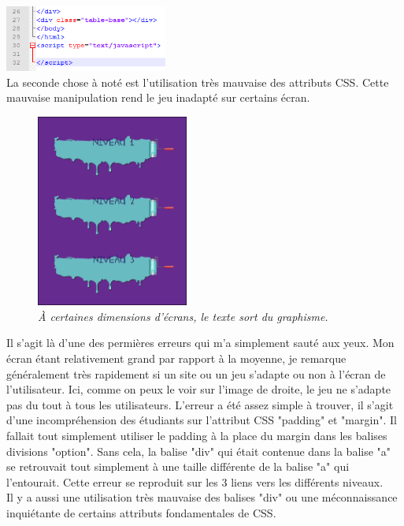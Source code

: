 \documentclass{article}
\begin{document}
\vspace{0.4cm}
\includegraphics[width=0.40\textwidth]{9}\\

La seconde chose \`a not\'e est l'utilisation tr\`es mauvaise des attributs CSS. Cette mauvaise manipulation rend le jeu inadapt\'e sur certains \'ecran.\\
\begin{figure}
\vspace{-13pt}
\centering
\includegraphics[width=5cm]{1}
\caption{\textit{\`A certaines dimensions d'\'ecrans, le texte sort du graphisme.}}
\end{figure}
{\hspace*{0.6cm}Il s'agit l\`a d'une des permi\`eres erreurs qui m'a simplement saut\'e aux yeux. Mon \'ecran \'etant relativement grand par rapport \`a la moyenne, je remarque g\'en\'eralement tr\`es rapidement si un site ou un jeu s'adapte ou non \`a l'\'ecran de l'utilisateur. Ici, comme on peux le voir sur l'image de droite, le jeu ne s'adapte pas du tout \`a tous les utilisateurs. L'erreur a \'et\'e assez simple \`a trouver, il s'agit d'une incompr\'ehension des \'etudiants sur l'attribut CSS "padding" et "margin". Il fallait tout simplement utiliser le padding \`a la place du margin dans les balises divisions "option". Sans cela, la balise "div" qui \'etait contenue dans la balise "a" se retrouvait tout simplement \`a une taille diff\'erente de la balise "a" qui l'entourait. Cette erreur se reproduit sur les 3 liens vers les diff\'erents niveaux.}\\

Il y a aussi une utilisation tr\`es mauvaise des balises "div" ou une m\'econnaissance inqui\'etante de certains attributs fondamentales de CSS.\\
\end{document}
